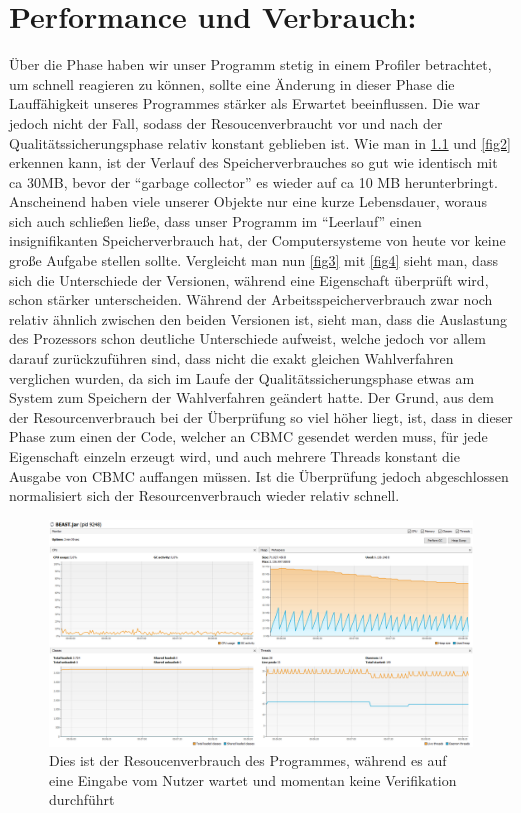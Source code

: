 \documentclass[a4paper]{scrreprt}
\begin{document}
\chapter{Performance und Verbrauch:}
Über die Phase haben wir unser Programm stetig in einem Profiler betrachtet, um
schnell reagieren zu können, sollte eine Änderung in dieser Phase die
Lauffähigkeit unseres Programmes stärker als Erwartet beeinflussen.
\newline
Die war jedoch nicht der Fall, sodass der Resoucenverbraucht vor und nach der
Qualitätssicherungsphase relativ konstant geblieben ist.
\newline
Wie man in \ref{fig1} und \ref{fig2} erkennen kann, ist der Verlauf des
Speicherverbrauches so gut wie identisch mit ca 30MB, bevor der "`garbage
collector"' es wieder auf ca 10 MB herunterbringt. Anscheinend haben viele
unserer Objekte nur eine kurze Lebensdauer, woraus sich auch schließen ließe,
dass unser Programm im "`Leerlauf"' einen insignifikanten Speicherverbrauch hat,
der Computersysteme von heute vor keine große Aufgabe stellen sollte.
\newline
Vergleicht man nun \ref{fig3} mit \ref{fig4} sieht man, dass sich die
Unterschiede der Versionen, während eine Eigenschaft überprüft wird, schon
stärker unterscheiden. Während der Arbeitsspeicherverbrauch zwar noch relativ
ähnlich zwischen den beiden Versionen ist, sieht man, dass die Auslastung des
Prozessors schon deutliche Unterschiede aufweist, welche jedoch vor allem darauf
zurückzuführen sind, dass nicht die exakt gleichen Wahlverfahren verglichen
wurden, da sich im Laufe der Qualitätssicherungsphase etwas am System zum
Speichern der Wahlverfahren geändert hatte.
\newline
Der Grund, aus dem der Resourcenverbrauch bei der Überprüfung so viel höher
liegt, ist, dass in dieser Phase zum einen der Code, welcher an CBMC gesendet
werden muss, für jede Eigenschaft einzeln erzeugt wird, und auch mehrere Threads
konstant die Ausgabe von CBMC auffangen müssen.
Ist die Überprüfung jedoch abgeschlossen normalisiert sich der
Resourcenverbrauch wieder relativ schnell.

\newpage
\begin{figure}[ht]
	\centering
  \includegraphics[width=1.0\textwidth,
  height=0.40\textwidth]{images/OLD_NO.png} \caption{Dies ist der
  Resoucenverbrauch des Programmes, während es auf eine Eingabe vom Nutzer wartet und momentan keine Verifikation durchführt}
	\label{fig1}
\end{figure}
\end{document}
